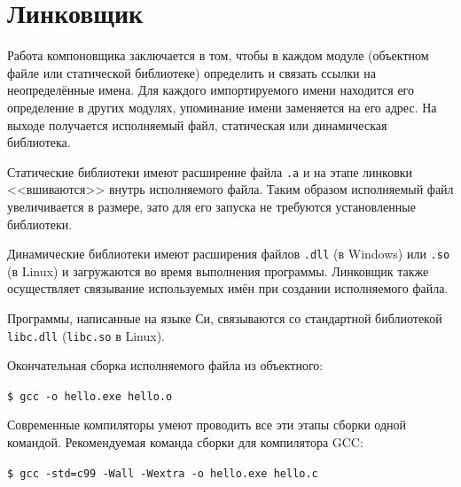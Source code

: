 \documentclass[myc.tex]{subfiles}
\begin{document}
\section{Линковщик}

Работа компоновщика заключается в том, чтобы в каждом модуле (объектном файле или статической библиотеке) определить и связать ссылки на неопределённые имена. Для каждого импортируемого имени находится его определение в других модулях, упоминание имени заменяется на его адрес. На выходе получается исполняемый файл, статическая или динамическая библиотека.

Статические библиотеки имеют расширение файла \texttt{.a} и на этапе линковки <<вшиваются>> внутрь исполняемого файла. Таким образом исполняемый файл увеличивается в размере, зато для его запуска не требуются установленные библиотеки.

Динамические библиотеки имеют расширения файлов \texttt{.dll} (в Windows) или \texttt{.so} (в Linux) и загружаются во время выполнения программы. Линковщик также осуществляет связывание используемых имён при создании исполняемого файла.

Программы, написанные на языке Си, связываются со стандартной библиотекой \texttt{libc.dll} (\texttt{libc.so} в Linux).

Окончательная сборка исполняемого файла из объектного:

\texttt{\$ gcc -o hello.exe hello.o}


Современные компиляторы умеют проводить все эти этапы сборки одной командой. Рекомендуемая команда сборки для компилятора GCC:

\texttt{\$ gcc -std=c99 -Wall -Wextra -o hello.exe hello.c}
\end{document}
